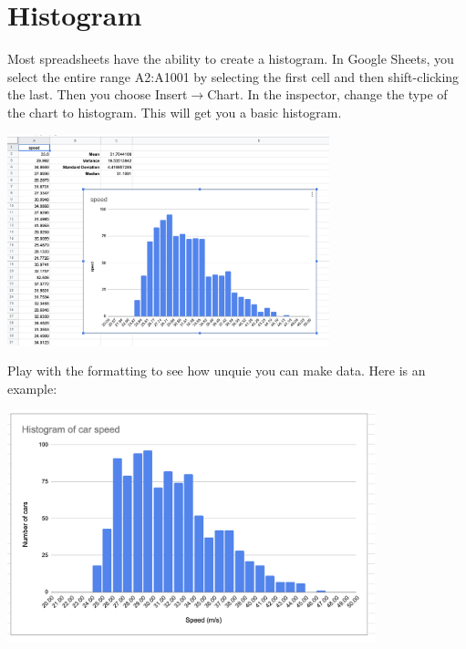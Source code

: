 \section{Histogram}

Most spreadsheets have the ability to create a histogram. In Google
Sheets, you select the entire range A2:A1001 by selecting the first
cell and then shift-clicking the last. Then you choose
Insert$\rightarrow$Chart. In the inspector, change the type of the
chart to histogram. This will get you a basic histogram.

\includegraphics[width=0.7\textwidth]{default_histogram.png}

Play with the formatting to see how unquie you can make data. Here is an example:

\includegraphics[width=0.8\textwidth]{final_histogram.png}

